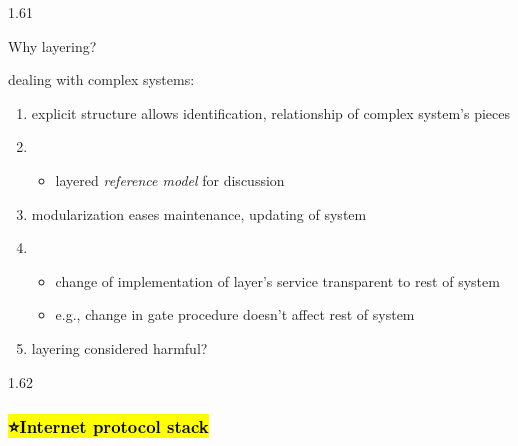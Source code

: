 \documentclass[
]{article}
\begin{document}
1.61

Why layering?

dealing with complex systems:

\begin{enumerate}
\def\labelenumi{\arabic{enumi}.}
\item
  explicit structure allows identification, relationship of complex
  system's pieces
\item
  \begin{itemize}
  \item
    layered \emph{reference model} for discussion
  \end{itemize}
\item
  modularization eases maintenance, updating of system
\item
  \begin{itemize}
  \item
    change of implementation of layer's service transparent to rest of
    system
  \item
    e.g., change in gate procedure doesn't affect rest of system
  \end{itemize}
\item
  layering considered harmful?
\end{enumerate}

1.62

\hypertarget{internet-protocol-stack}{%
\subsubsection{\texorpdfstring{\hl{⭐️Internet protocol
stack}}{⭐️Internet protocol stack}}\label{internet-protocol-stack}}
\end{document}
